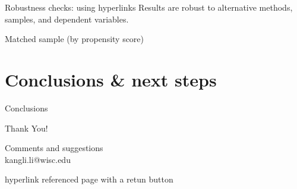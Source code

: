 \documentclass[notes,11pt, aspectratio=169]{beamer}
\newenvironment{wideitemize}{\itemize\addtolength{\itemsep}{10pt}}{\enditemize}  %
\begin{document}
\begin{frame}[label=robustness_check_subprime]{Robustness checks: using hyperlinks}
Results are robust to alternative methods, samples, and dependent variables.
\begin{wideitemize}
    \item <1-> Matched sample (by propensity score) \hyperlink{subprime_match}{} 
\end{wideitemize}
\end{frame}



\section{Conclusions \& next steps}

\begin{frame}{Conclusions}
\end{frame}

\begin{frame}
\centering
\Large{Thank You!} 
\vspace{2em}

\large{Comments and suggestions \\ kangli.li@wisc.edu}
\end{frame} %

\begin{frame}
\end{frame} %



\appendix 

\begin{frame}[label=subprime_match]{hyperlink referenced page with a retun button}
\hfill \hyperlink{robustness_check_subprime}{}
\end{frame}
\end{document}
